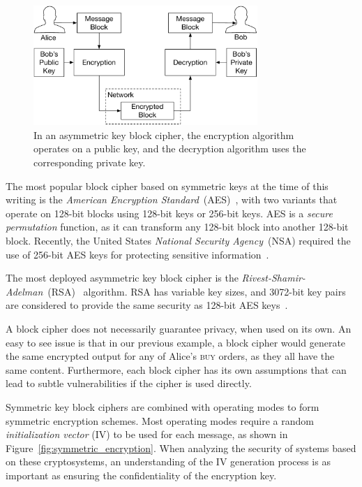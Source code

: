 \begin{figure}[hbt]
  \centering
  \includegraphics[width=85mm]{figures/asymmetric_block_cipher.pdf}
  \caption{
    In an asymmetric key block cipher, the encryption algorithm operates on a
    public key, and the decryption algorithm uses the corresponding private
    key.
  }
  \label{fig:asymmetric_block_cipher}
\end{figure}

The most popular block cipher based on symmetric keys at the time of this
writing is the
\textit{American Encryption Standard}~(AES)~\cite{daemen1999aes, fips2001aes},
with two variants that operate on 128-bit blocks using 128-bit keys or 256-bit
keys. AES is a \textit{secure permutation} function, as it can transform any
128-bit block into another 128-bit block. Recently, the United States
\textit{National Security Agency}~(NSA) required the use of 256-bit AES keys
for protecting sensitive information~\cite{nsa2015suiteb}.

The most deployed asymmetric key block cipher is the
\textit{Rivest-Shamir-Adelman}~(RSA)~\cite{rivest1978rsa} algorithm. RSA has
variable key sizes, and 3072-bit key pairs are considered to provide the same
security as 128-bit AES keys~\cite{fips2012keysize}.

A block cipher does not necessarily guarantee privacy, when used  on its own.
An easy to see issue is that in our previous example, a block cipher would
generate the same encrypted output for any of Alice's \textsc{buy} orders, as
they all have the same content. Furthermore, each block cipher has its own
assumptions that can lead to subtle vulnerabilities if the cipher is used
directly.

Symmetric key block ciphers are combined with operating modes to form symmetric
encryption schemes. Most operating modes require a random
\textit{initialization vector} (IV) to be used for each message, as shown in
Figure~\ref{fig:symmetric_encryption}. When analyzing the security of systems
based on these cryptosystems, an understanding of the IV generation process is
as important as ensuring the confidentiality of the encryption key.


